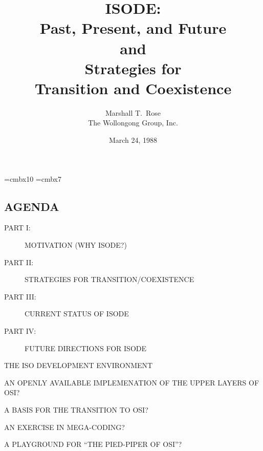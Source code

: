 

\font\xx=cmbx10
\font\yy=cmbx7

\raggedright


\let\tradeNAMfont=\relax
\let\tradeORGfont=\relax



\title	{ISODE:\\ Past, Present, and Future\\[0.25in] and\\[0.25in]
	 Strategies for\\ Transition and Coexistence}
\author	{Marshall T.~Rose\\ The Wollongong Group, Inc.}
\date	{March 24, 1988}
\maketitlepage


\begin{bwslide}
\part*	{AGENDA}\bf

\begin{description}
\item[PART I:]		MOTIVATION (WHY ISODE?)

\item[PART II:]		STRATEGIES FOR TRANSITION/COEXISTENCE 

\item[PART III:]	CURRENT STATUS OF ISODE

\item[PART IV:]		FUTURE DIRECTIONS FOR ISODE
\end{description}
\end{bwslide}


\begin{bwslide}

\begin{nrtc}
\item	THE ISO DEVELOPMENT ENVIRONMENT

\item	AN OPENLY AVAILABLE IMPLEMENATION OF THE UPPER LAYERS OF OSI?

\item	A BASIS FOR THE TRANSITION TO OSI?

\item	AN EXERCISE IN MEGA-CODING?

\item	A PLAYGROUND FOR ``THE PIED-PIPER OF OSI''?
\end{nrtc}
\end{bwslide}


